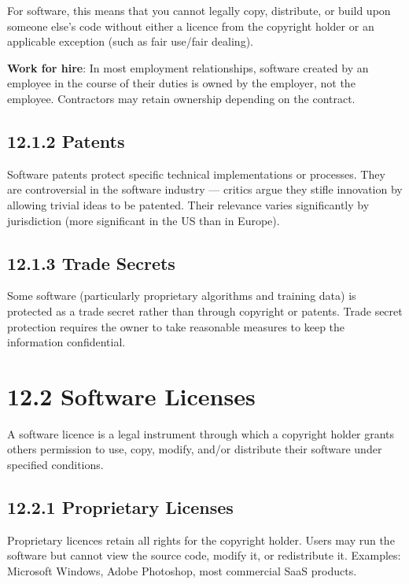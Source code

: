 \documentclass[11pt,a4paper]{book}
\begin{document}
For software, this means that you cannot legally copy, distribute, or build upon someone else's code without either a licence from the copyright holder or an applicable exception (such as fair use/fair dealing).

\textbf{Work for hire}: In most employment relationships, software created by an employee in the course of their duties is owned by the employer, not the employee. Contractors may retain ownership depending on the contract.

\subsection{12.1.2 Patents}

Software patents protect specific technical implementations or processes. They are controversial in the software industry --- critics argue they stifle innovation by allowing trivial ideas to be patented. Their relevance varies significantly by jurisdiction (more significant in the US than in Europe).

\subsection{12.1.3 Trade Secrets}

Some software (particularly proprietary algorithms and training data) is protected as a trade secret rather than through copyright or patents. Trade secret protection requires the owner to take reasonable measures to keep the information confidential.

\medskip

\section{12.2 Software Licenses}

A software licence is a legal instrument through which a copyright holder grants others permission to use, copy, modify, and/or distribute their software under specified conditions.

\subsection{12.2.1 Proprietary Licenses}

Proprietary licences retain all rights for the copyright holder. Users may run the software but cannot view the source code, modify it, or redistribute it. Examples: Microsoft Windows, Adobe Photoshop, most commercial SaaS products.
\end{document}
